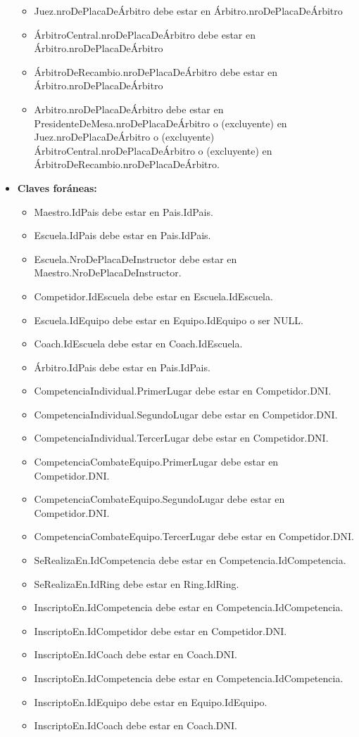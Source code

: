 \begin{itemize}
\begin{itemize}
\item Juez.nroDePlacaDeÁrbitro debe estar en Árbitro.nroDePlacaDeÁrbitro
\item ÁrbitroCentral.nroDePlacaDeÁrbitro debe estar en Árbitro.nroDePlacaDeÁrbitro
\item ÁrbitroDeRecambio.nroDePlacaDeÁrbitro debe estar en Árbitro.nroDePlacaDeÁrbitro
\item Arbitro.nroDePlacaDeÁrbitro debe estar en PresidenteDeMesa.nroDePlacaDeÁrbitro o (excluyente) en Juez.nroDePlacaDeÁrbitro o (excluyente) ÁrbitroCentral.nroDePlacaDeÁrbitro o (excluyente) en ÁrbitroDeRecambio.nroDePlacaDeÁrbitro.
\end{itemize}
\item \textbf{Claves foráneas:}
\begin{itemize}
\item Maestro.IdPais debe estar en Pais.IdPais.
\item Escuela.IdPais debe estar en Pais.IdPais.
\item Escuela.NroDePlacaDeInstructor debe estar en Maestro.NroDePlacaDeInstructor.
\item Competidor.IdEscuela debe estar en Escuela.IdEscuela.
\item Escuela.IdEquipo debe estar en Equipo.IdEquipo o ser NULL.
\item Coach.IdEscuela debe estar en Coach.IdEscuela.
\item Árbitro.IdPais debe estar en Pais.IdPais.
\item CompetenciaIndividual.PrimerLugar debe estar en Competidor.DNI.
\item CompetenciaIndividual.SegundoLugar debe estar en Competidor.DNI.
\item CompetenciaIndividual.TercerLugar debe estar en Competidor.DNI.
\item CompetenciaCombateEquipo.PrimerLugar debe estar en Competidor.DNI.
\item CompetenciaCombateEquipo.SegundoLugar debe estar en Competidor.DNI.
\item CompetenciaCombateEquipo.TercerLugar debe estar en Competidor.DNI.
\item SeRealizaEn.IdCompetencia debe estar en Competencia.IdCompetencia.
\item SeRealizaEn.IdRing debe estar en Ring.IdRing.
\item InscriptoEn.IdCompetencia debe estar en Competencia.IdCompetencia.
\item InscriptoEn.IdCompetidor debe estar en Competidor.DNI.
\item InscriptoEn.IdCoach debe estar en Coach.DNI.
\item InscriptoEn.IdCompetencia debe estar en Competencia.IdCompetencia.
\item InscriptoEn.IdEquipo debe estar en Equipo.IdEquipo.
\item InscriptoEn.IdCoach debe estar en Coach.DNI.
\end{itemize}
\end{itemize}
